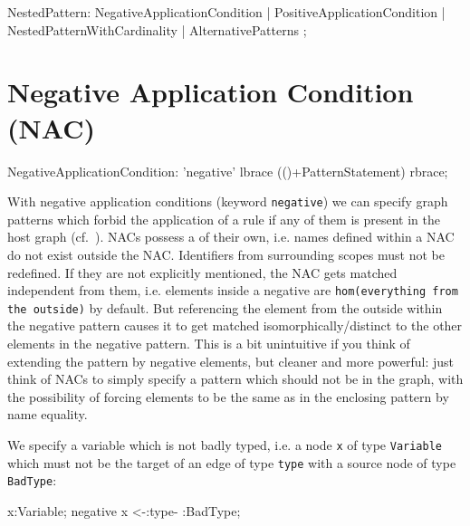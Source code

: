 \begin{rail}  
  NestedPattern: 
    NegativeApplicationCondition |
    PositiveApplicationCondition |
    NestedPatternWithCardinality |
    AlternativePatterns 
    ;
\end{rail}


\section{Negative Application Condition (NAC)}
\label{nac}

\begin{rail}  
  NegativeApplicationCondition: 
    'negative' lbrace (()+PatternStatement) rbrace;
\end{rail}

With negative application conditions (keyword \texttt{negative}) we can specify graph patterns which forbid the application of a rule if any of them is present in the host graph (cf.~\cite{adam}). 
NACs possess a  of their own, i.e. names defined within a NAC do not exist outside the NAC. 
Identifiers from surrounding scopes must not be redefined.
If they are not explicitly mentioned, the NAC gets matched independent from them, i.e. elements inside a negative are \texttt{hom(everything from the outside)} by default.
But referencing the element from the outside within the negative pattern causes it to get matched isomorphically/distinct to the other elements in the negative pattern. 
This is a bit unintuitive if you think of extending the pattern by negative elements, but cleaner and more powerful: 
just think of NACs to simply specify a pattern which should not be in the graph, with the possibility of forcing elements to be the same as in the enclosing pattern by name equality.

  \begin{example}
    We specify a variable which is not badly typed, i.e. a node \texttt{x} of type \texttt{Variable} which must not be the target of an edge of type \texttt{type} with a source node of type \texttt{BadType}:
    \begin{grgen}
  x:Variable;
  negative {
    x <-:type- :BadType;
  }
    \end{grgen}
  \end{example}
 
